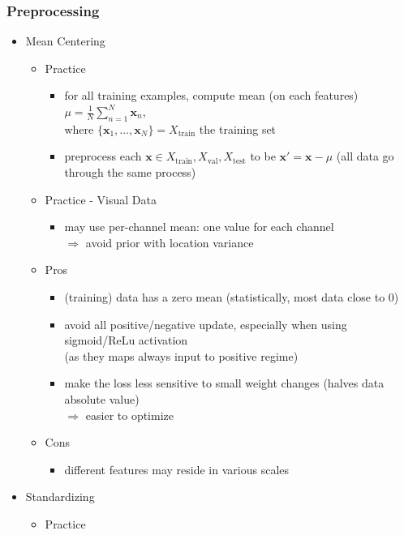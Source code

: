 \subsubsection{Preprocessing}
\begin{itemize}
\item Mean Centering
	\begin{itemize}
	\item Practice
		\begin{itemize}
		\item for all training examples, compute mean (on each features) $\displaystyle \mu=\frac 1 N \sum_{n=1}^N{\mathbf x_n}$, \\
		where $\{\mathbf x_1,...,\mathbf x_N\}=X_\text{train}$ the training set
		\item preprocess each $\mathbf x \in X_\text{train}, X_\text{val}, X_\text{test}$ to be $\mathbf x'=\mathbf x -\mu$
		(all data go through the same process)
		\end{itemize}
	\item Practice - Visual Data
		\begin{itemize}
		\item may use per-channel mean: one value for each channel \\
		$\Rightarrow$ avoid prior with location variance
		\end{itemize}
	\item Pros
		\begin{itemize}
		\item (training) data has a zero mean (statistically, most data close to $0$)
		\item avoid all positive/negative update, especially when using sigmoid/ReLu activation \\
		(as they maps always input to positive regime)
		\item make the loss less sensitive to small weight changes (halves data absolute value) \\
		$\Rightarrow$ easier to optimize
		\end{itemize}
	\item Cons
		\begin{itemize}
		\item different features may reside in various scales
		\end{itemize}
	\end{itemize}
\item Standardizing
	\begin{itemize}
	\item Practice
		\begin{itemize}

\end{itemize}
\end{itemize}
\end{itemize}
